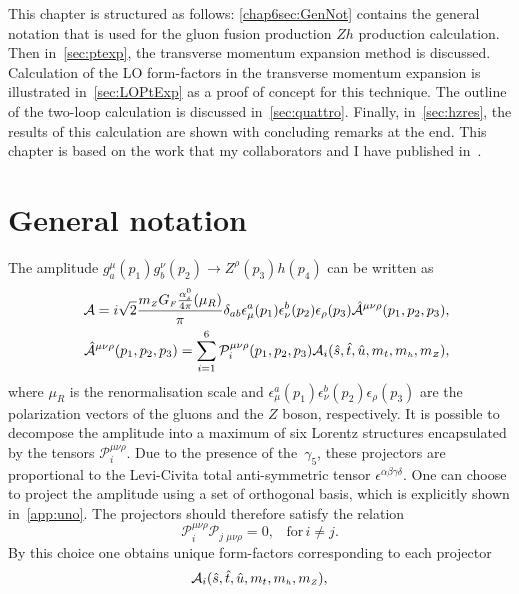 \par This chapter is structured as follows: \autoref{chap6sec:GenNot} contains the general notation that is used for the gluon fusion production $Zh$ production calculation. Then in~\autoref{sec:ptexp}, the transverse momentum expansion method is discussed.  Calculation of the LO form-factors in the transverse momentum expansion is illustrated in~\autoref{sec:LOPtExp} as a proof of concept for this technique. The outline of the two-loop calculation is discussed in~\autoref{sec:quattro}. Finally, in~\autoref{sec:hzres}, the results of this calculation are shown with concluding remarks at the end.  This chapter is based on the work that my collaborators and I have published in~\cite{Alasfar:2021ppe}. 
\section{General notation \label{chap6sec:GenNot} }
\par The amplitude  $g^\mu_a(p_1)g^\nu_b(p_2)\to Z^\rho(p_3) h(p_4)$ can be written as
\begin{align}
	&&{\cal A}=i \sqrt{2}\frac{m_{ \scriptscriptstyle Z} G_{ \scriptscriptstyle F} \frac{\alpha_s^0}{4 \pi}(\mu_R)}{\pi}\delta_{ab}\epsilon^a_\mu(p_1)
	\epsilon^b_\nu(p_2)\epsilon_\rho(p_3)\hat{{\cal A}}^{\mu\nu\rho}(p_1,p_2,p_3 ),\\
	&&\hat{{\cal A}}^{\mu\nu\rho}(p_1,p_2,p_3 )=\sum_{i=1}^{6}
	\mathcal{P}_i^{\mu\nu\rho}(p_1,p_2,p_3 )
	{\cal A}_i(\hat{s},\hat{t},\hat{u},m_t,m_{ \scriptscriptstyle h},m_{ \scriptscriptstyle Z}),
	\label{eq:amp}
\end{align}
where  $\mu_R$ is the renormalisation scale and
$\epsilon^a_\mu(p_1)\epsilon^b_\nu(p_2)\epsilon_\rho(p_3)$ are the
polarization vectors of the gluons and the $Z$ boson, respectively.  It is possible to decompose the amplitude into a maximum of six Lorentz structures encapsulated by the 
tensors $\mathcal{P}_i^{\mu\nu\rho}$. Due to the presence of the~$\gamma_5$, these projectors are
proportional to the Levi-Civita total anti-symmetric tensor
$\epsilon^{\alpha\beta\gamma\delta}$. One can choose to project the amplitude using a set of orthogonal basis, which is explicitly shown in~\autoref{app:uno}. The projectors should therefore satisfy the relation
\begin{equation}
	\mathcal{P}_i^{\mu\nu\rho} \mathcal{P}_j\,_{\mu\nu\rho} = 0, \,\,\, \,\, \text{for}\, i \neq j .
\end{equation}
By this choice one obtains unique form-factors corresponding to each projector
\begin{equation}
	{\cal A}_i(\hat{s},\hat{t},\hat{u},m_t,m_{ \scriptscriptstyle h},m_{ \scriptscriptstyle Z}),
\end{equation}
